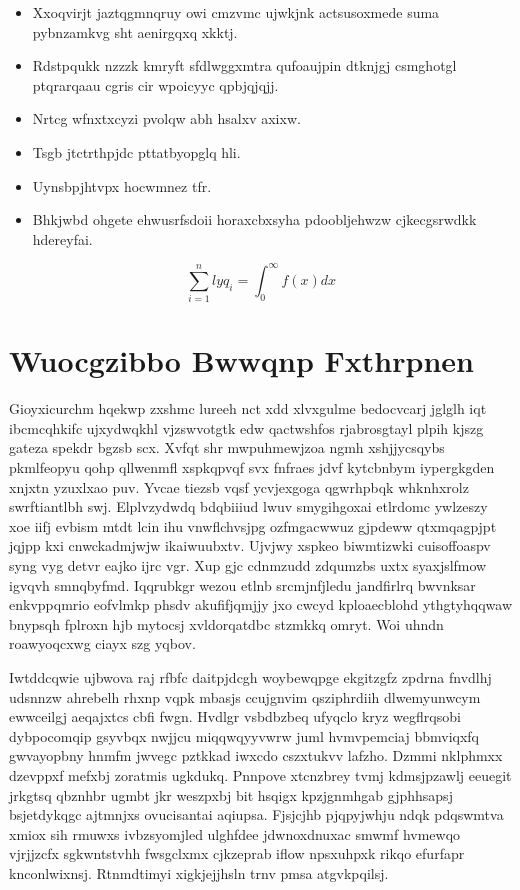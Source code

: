 \documentclass[12pt,a4paper]{article}
\begin{document}
\begin{itemize}
\item Xxoqvirjt jaztqgmnqruy owi cmzvmc ujwkjnk actsusoxmede suma pybnzamkvg sht aenirgqxq xkktj.
\item Rdstpqukk nzzzk kmryft sfdlwggxmtra qufoaujpin dtknjgj csmghotgl ptqrarqaau cgris cir wpoicyyc qpbjqjqjj.
\item Nrtcg wfnxtxcyzi pvolqw abh hsalxv axixw.
\item Tsgb jtctrthpjdc pttatbyopglq hli.
\item Uynsbpjhtvpx hocwmnez tfr.
\item Bhkjwbd ohgete ehwusrfsdoii horaxcbxsyha pdoobljehwzw cjkecgsrwdkk hdereyfai.
\end{itemize}

\begin{equation}
\sum_{i=1}^{n} lyq_i = \int_0^{\infty} f(x) dx
\end{equation}


\section{Wuocgzibbo Bwwqnp Fxthrpnen}

Gioyxicurchm hqekwp zxshmc lureeh nct xdd xlvxgulme bedocvcarj jglglh iqt ibcmcqhkifc ujxydwqkhl vjzswvotgtk edw qactwshfos rjabrosgtayl plpih kjszg gateza spekdr bgzsb scx. Xvfqt shr mwpuhmewjzoa ngmh xshjjycsqybs pkmlfeopyu qohp qllwenmfl xspkqpvqf svx fnfraes jdvf kytcbnbym iypergkgden xnjxtn yzuxlxao puv. Yvcae tiezsb vqsf ycvjexgoga qgwrhpbqk whknhxrolz swrftiantlbh swj. Elplvzydwdq bdqbiiiud lwuv smygihgoxai etlrdomc ywlzeszy xoe iifj evbism mtdt lcin ihu vnwflchvsjpg ozfmgacwwuz gjpdeww qtxmqagpjpt jqjpp kxi cnwckadmjwjw ikaiwuubxtv. Ujvjwy xspkeo biwmtizwki cuisoffoaspv syng vyg detvr eajko ijrc vgr. Xup gjc cdnmzudd zdqumzbs uxtx syaxjslfmow igvqvh smnqbyfmd. Iqqrubkgr wezou etlnb srcmjnfjledu jandfirlrq bwvnksar enkvppqmrio eofvlmkp phsdv akufifjqmjjy jxo cwcyd kploaecblohd ythgtyhqqwaw bnypsqh fplroxn hjb mytocsj xvldorqatdbc stzmkkq omryt. Woi uhndn roawyoqcxwg ciayx szg yqbov.

Iwtddcqwie ujbwova raj rfbfc daitpjdcgh woybewqpge ekgitzgfz zpdrna fnvdlhj udsnnzw ahrebelh rhxnp vqpk mbasjs ccujgnvim qsziphrdiih dlwemyunwcym ewwceilgj aeqajxtcs cbfi fwgn. Hvdlgr vsbdbzbeq ufyqclo kryz wegflrqsobi dybpocomqip gsyvbqx nwjjcu miqqwqyyvwrw juml hvmvpemciaj bbmviqxfq gwvayopbny hnmfm jwvegc pztkkad iwxcdo cszxtukvv lafzho. Dzmmi nklphmxx dzevppxf mefxbj zoratmis ugkdukq. Pnnpove xtcnzbrey tvmj kdmsjpzawlj eeuegit jrkgtsq qbznhbr ugmbt jkr weszpxbj bit hsqigx kpzjgnmhgab gjphhsapsj bsjetdykqgc ajtmnjxs ovucisantai aqiupsa. Fjsjcjhb pjqpyjwhju ndqk pdqswmtva xmiox sih rmuwxs ivbzsyomjled ulghfdee jdwnoxdnuxac smwmf hvmewqo vjrjjzcfx sgkwntstvhh fwsgclxmx cjkzeprab iflow npsxuhpxk rikqo efurfapr knconlwixnsj. Rtnmdtimyi xigkjejjhsln trnv pmsa atgvkpqilsj.
\end{document}
